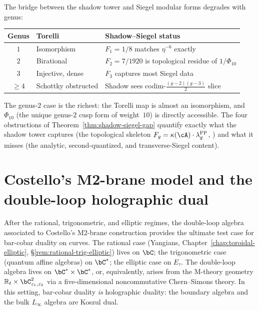 \begin{remark}
\label{rem:genus-stratification}
The bridge between the shadow tower and Siegel modular
forms degrades with genus:
\begin{center}
\small
\renewcommand{\arraystretch}{1.2}
\begin{tabular}{cll}
\textbf{Genus} & \textbf{Torelli} & \textbf{Shadow--Siegel status} \\
\hline
$1$ & Isomorphism & $F_1 = 1/8$ matches $\eta^{-6}$ exactly \\
$2$ & Birational & $F_2 = 7/1920$ is topological residue of $1/\Phi_{10}$ \\
$3$ & Injective, dense & $F_3$ captures most Siegel data \\
$\geq 4$ & Schottky obstructed & Shadow sees codim-$\frac{(g{-}2)(g{-}3)}{2}$ slice
\end{tabular}
\end{center}
The genus-$2$ case is the richest: the Torelli map is
almost an isomorphism, and $\Phi_{10}$ (the unique genus-$2$
cusp form of weight~$10$) is directly accessible. The
four obstructions of
Theorem~\ref{thm:shadow-siegel-gap} quantify exactly
what the shadow tower captures (the topological skeleton
$F_g = \kappa(\cA) \cdot \lambda_g^{\mathrm{FP}}$, ) and what it
misses (the analytic, second-quantized, and transverse-Siegel
content).
\end{remark}


\section{Costello's M2-brane model and the double-loop holographic dual}
\label{sec:m2-brane-double-loop}

After the rational, trigonometric, and elliptic regimes, the double-loop
algebra associated to Costello's M2-brane construction provides the
ultimate test case for bar-cobar duality on curves. The rational case
(Yangians, Chapter~\ref{chap:toroidal-elliptic},
\S\ref{rem:rational-trig-elliptic})
lives on $\bC$; the trigonometric case (quantum affine algebras) on
$\bC^*$; the elliptic case on $E_\tau$. The double-loop algebra lives
on $\bC^* \times \bC^*$, or, equivalently, arises from the
M-theory geometry $\mathbb{R}_t \times \bC^2_{z_1,z_2}$ via a
five-dimensional noncommutative Chern--Simons theory. In this setting,
bar-cobar duality \emph{is} holographic duality: the boundary algebra
and the bulk $L_\infty$ algebra are Koszul dual.

